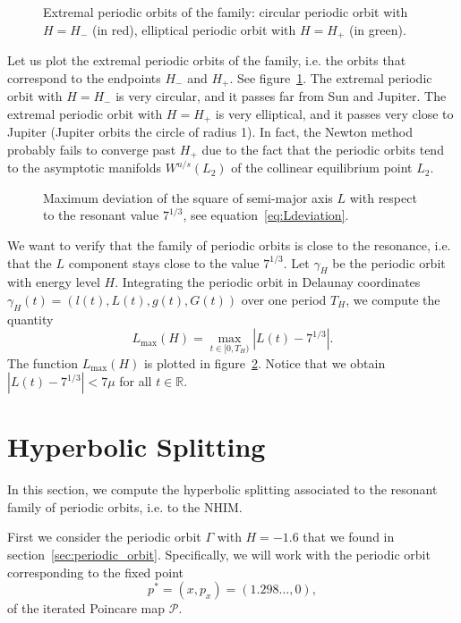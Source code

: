 \documentclass[a4paper]{amsart}
\theoremstyle{remark}
\newcommand{\sixmap}{\mathcal{P}}
\newcommand{\RR}{\mathbb{R}}
\begin{document}
\begin{figure}
\caption{Extremal periodic orbits of the family: circular periodic
orbit with $H=H_-$ (in red), elliptical periodic orbit with $H=H_+$
(in green).}
\label{fig:trtbp_porbits}
\end{figure}

Let us plot the extremal periodic orbits of the family, i.e. the
orbits that correspond to the endpoints $H_-$ and $H_+$. See
figure~\ref{fig:trtbp_porbits}.
The extremal periodic orbit with $H=H_-$ is very circular, and it
passes far from Sun and Jupiter.
The extremal periodic orbit with $H=H_+$ is very elliptical, and it
passes very close to Jupiter (Jupiter orbits the circle of radius 1).
In fact, the Newton method probably fails to converge past $H_+$ due
to the fact that the periodic orbits tend to the asymptotic manifolds
$W^{u/s}(L_2)$ of the collinear equilibrium point $L_2$.

\begin{figure}
\caption{Maximum deviation of the square of semi-major axis $L$ with
respect to the resonant value $7^{1/3}$, see
equation~\eqref{eq:Ldeviation}.}
\label{fig:Ldeviation}
\end{figure}

We want to verify that the family of periodic orbits is close to the
resonance, i.e. that the $L$ component stays close to the value
$7^{1/3}$.
Let $\gamma_H$ be the periodic orbit with energy level $H$.
Integrating the periodic orbit in Delaunay coordinates
$\gamma_H(t)=(l(t),L(t),g(t),G(t))$ over one period $T_H$, we compute
the quantity 
\begin{equation} \label{eq:Ldeviation}
 L_{\max}(H) = \max_{t \in [0,T_H)} |L(t)-7^{1/3}|.
\end{equation}
The function $L_{\max}(H)$ is plotted in figure~\ref{fig:Ldeviation}.
Notice that we obtain $|L(t)-7^{1/3}| < 7\mu$ for all $t\in \RR$.

\section{Hyperbolic Splitting}\label{sec:hyperbolic_splitting}

In this section, we compute the hyperbolic splitting associated to the
resonant family of periodic orbits, i.e. to the NHIM.

First we consider the periodic orbit $\Gamma$ with $H=-1.6$ that we
found in section~\ref{sec:periodic_orbit}.
Specifically, we will work with the periodic orbit corresponding to the fixed
point 
\[ p^*=(x,p_x)=(1.298\dots,0), \]
of the iterated Poincare map $\sixmap$.
\end{document}
